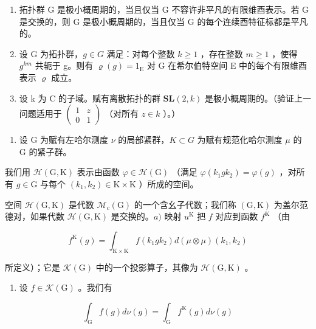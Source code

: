 \begin{enumerate}
\def\labelenumi{\alph{enumi})}
\item
  拓扑群 G 是极小概周期的，当且仅当 G 不容许非平凡的有限维酉表示。若 G 是交换的，则 G 是极小概周期的，当且仅当 G 的每个连续酉特征标都是平凡的。
\item
  设 G 为拓扑群，\(g \in G\) 满足：对每个整数 \(k \geqslant 1\) ，存在整数 \(m \geqslant 1\) ，使得 \(g^{km}\) 共轭于 g。则有 \(\varrho(g) = 1_{\mathrm{E}}\) 对 G 在希尔伯特空间 E 中的每个有限维酉表示 \(\varrho\) 成立。
\item
  设 k 为 C 的子域。赋有离散拓扑的群 \(\mathbf{SL}(2,k)\) 是极小概周期的。（验证上一问题适用于 \(\begin{pmatrix}1 & z \\ 0 & 1\end{pmatrix}\) （对所有 \(z \in k\) ）。）
\end{enumerate}

\begin{enumerate}
\def\labelenumi{\arabic{enumi})}
\setcounter{enumi}{24}
\tightlist
\item
  设 G 为赋有左哈尔测度 \(\nu\) 的局部紧群，\(K \subset G\) 为赋有规范化哈尔测度 \(\mu\) 的 G 的紧子群。
\end{enumerate}

我们用 \(\mathcal{H}(\mathrm{G},\mathrm{K})\) 表示由函数 \(\varphi \in \mathcal{H}(\mathrm{G})\) （满足 \(\varphi (k_1gk_2) = \varphi (g)\) ，对所有 \(g\in \mathrm{G}\) 与每个 \((k_{1},k_{2})\in \mathrm{K}\times \mathrm{K}\) ）所成的空间。

空间 \(\mathcal{H}(\mathrm{G},\mathrm{K})\) 是代数 \(\mathcal{M}_c(\mathrm{G})\) 的一个含幺子代数；我们称 \((\mathrm{G},\mathrm{K})\) 为盖尔范德对，如果代数 \(\mathcal{H}(\mathrm{G},\mathrm{K})\) 是交换的。\(a)\) 映射 \(u^{\mathrm{K}}\) 把 \(f\) 对应到函数 \(f^{\mathrm{K}}\) （由

\[
f ^ {\mathrm{K}} (g) = \int_ {\mathrm{K} \times \mathrm{K}} f (k _ {1} g k _ {2}) d (\mu \otimes \mu) (k _ {1}, k _ {2})
\]

所定义）；它是 \(\mathcal{K}(\mathrm{G})\) 中的一个投影算子，其像为 \(\mathcal{H}(\mathrm{G},\mathrm{K})\) 。

\begin{enumerate}
\def\labelenumi{\alph{enumi})}
\setcounter{enumi}{1}
\tightlist
\item
  设 \(f\in \mathcal{K}(\mathrm{G})\) 。我们有
\end{enumerate}

\[
\int_ {\mathrm{G}} f (g) d \nu (g) = \int_ {\mathrm{G}} f ^ {\mathrm{K}} (g) d \nu (g)
\]

